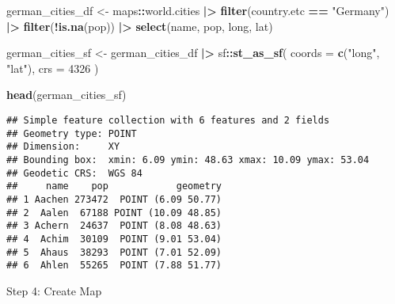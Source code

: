 \documentclass[
]{article}
\newenvironment{Shaded}{\begin{snugshade}}{\end{snugshade}}
\newcommand{\AttributeTok}[1]{\textcolor[rgb]{0.13,0.29,0.53}{#1}}
\newcommand{\DecValTok}[1]{\textcolor[rgb]{0.00,0.00,0.81}{#1}}
\newcommand{\FunctionTok}[1]{\textcolor[rgb]{0.13,0.29,0.53}{\textbf{#1}}}
\newcommand{\NormalTok}[1]{#1}
\newcommand{\OtherTok}[1]{\textcolor[rgb]{0.56,0.35,0.01}{#1}}
\newcommand{\SpecialCharTok}[1]{\textcolor[rgb]{0.81,0.36,0.00}{\textbf{#1}}}
\newcommand{\StringTok}[1]{\textcolor[rgb]{0.31,0.60,0.02}{#1}}
\begin{document}
\begin{Shaded}
\begin{Highlighting}[]
\NormalTok{german\_cities\_df }\OtherTok{\textless{}{-}}\NormalTok{ maps}\SpecialCharTok{::}\NormalTok{world.cities }\SpecialCharTok{|\textgreater{}} 
  \FunctionTok{filter}\NormalTok{(country.etc }\SpecialCharTok{==} \StringTok{"Germany"}\NormalTok{) }\SpecialCharTok{|\textgreater{}} 
  \FunctionTok{filter}\NormalTok{(}\SpecialCharTok{!}\FunctionTok{is.na}\NormalTok{(pop)) }\SpecialCharTok{|\textgreater{}} 
  \FunctionTok{select}\NormalTok{(name, pop, long, lat)}

\NormalTok{german\_cities\_sf }\OtherTok{\textless{}{-}}\NormalTok{ german\_cities\_df }\SpecialCharTok{|\textgreater{}}\NormalTok{ sf}\SpecialCharTok{::}\FunctionTok{st\_as\_sf}\NormalTok{(}
  \AttributeTok{coords =} \FunctionTok{c}\NormalTok{(}\StringTok{"long"}\NormalTok{, }\StringTok{"lat"}\NormalTok{),}
  \AttributeTok{crs =} \DecValTok{4326}
\NormalTok{)}

\FunctionTok{head}\NormalTok{(german\_cities\_sf)}
\end{Highlighting}
\end{Shaded}

\begin{verbatim}
## Simple feature collection with 6 features and 2 fields
## Geometry type: POINT
## Dimension:     XY
## Bounding box:  xmin: 6.09 ymin: 48.63 xmax: 10.09 ymax: 53.04
## Geodetic CRS:  WGS 84
##     name    pop            geometry
## 1 Aachen 273472  POINT (6.09 50.77)
## 2  Aalen  67188 POINT (10.09 48.85)
## 3 Achern  24637  POINT (8.08 48.63)
## 4  Achim  30109  POINT (9.01 53.04)
## 5  Ahaus  38293  POINT (7.01 52.09)
## 6  Ahlen  55265  POINT (7.88 51.77)
\end{verbatim}

Step 4: Create Map
\end{document}
